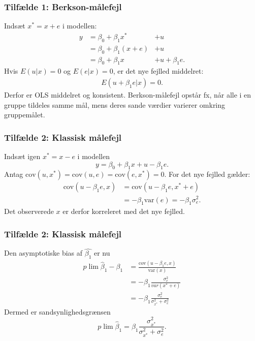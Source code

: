 \documentclass[aspectratio=43,t]{beamer}
\begin{document}

\begin{frame}
\frametitle{Tilfælde 1: Berkson-målefejl}

	Indsæt $x^{*}=x+e$ i modellen:
	\begin{align*}
	y &=\beta_{0} + \beta_{1}x^{*}	&+u 		\\
	  &=\beta_{0} + \beta_{1}(x+e)	&+u 		\\
	  &=\beta_{0} + \beta_{1}x      &+u +\beta_{1}e.
	\end{align*}
	Hvis $E(u|x)=0$ og $E(e|x)=0$, er det nye fejlled middelret:
	\begin{align*}
	E(u+\beta_1e|x)=0.
	\end{align*}
	Derfor er OLS middelret og konsistent. Berkson-målefejl opstår fx, når alle i en gruppe tildeles samme mål, mens deres sande værdier varierer omkring gruppemålet.

\end{frame}


\begin{frame}
\frametitle{Tilfælde 2: Klassisk målefejl}

	Indsæt igen $x^{*}=x-e$ i modellen
	\begin{equation*}
	y=\beta_{0}+\beta_{1}x+u-\beta_{1}e.
	\end{equation*}
	Antag $\text{cov}(u,x^*)=\text{cov}(u,e)=\text{cov}(e,x^*)=0$. For det nye fejlled gælder:
	\begin{align*}
	\text{cov}(u-\beta_1e,x)
	&=\text{cov}(u-\beta_1e,x^*+e)\\
	&=-\beta_1\text{var}(e)=-\beta_1\sigma_e^2.
	\end{align*}
	Det observerede $x$ er derfor korreleret med det nye fejlled.

\end{frame}


\begin{frame}
\frametitle{Tilfælde 2: Klassisk målefejl}

	Den asymptotiske bias af $\hat{\beta_1}$ er nu
	\begin{align*}
	p\lim \hat{\beta}_{1}-\beta _{1} &= \frac{\text{cov}(u-\beta _{1}e,x)}{\text{var}(x)} \\
											 &= -\beta_{1}\frac{\sigma_e^2}{var(x^{*} + e)} \\
											 &= -\beta_{1}\frac{\sigma_e^2}{\sigma_{x^*}^2+\sigma_e^2}
	\end{align*}
	Dermed er sandsynlighedsgrænsen
	\begin{equation*}
	p\lim \hat{\beta}_{1}
	=\beta_1\frac{\sigma_{x^*}^2}{\sigma_{x^*}^2+\sigma_e^2}.
	\end{equation*}

\end{frame}
\end{document}
